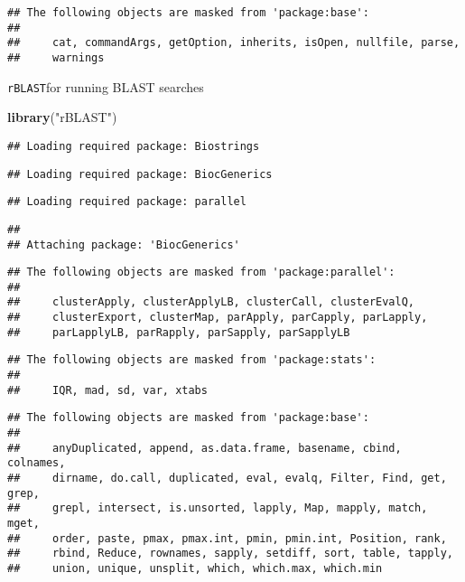 \documentclass[]{article}
\newenvironment{Shaded}{\begin{snugshade}}{\end{snugshade}}
\newcommand{\KeywordTok}[1]{\textcolor[rgb]{0.13,0.29,0.53}{\textbf{#1}}}
\newcommand{\NormalTok}[1]{#1}
\newcommand{\StringTok}[1]{\textcolor[rgb]{0.31,0.60,0.02}{#1}}
\begin{document}
\begin{verbatim}
## The following objects are masked from 'package:base':
## 
##     cat, commandArgs, getOption, inherits, isOpen, nullfile, parse,
##     warnings
\end{verbatim}

\texttt{rBLAST}for running BLAST searches

\begin{Shaded}
\begin{Highlighting}[]
\KeywordTok{library}\NormalTok{(}\StringTok{"rBLAST"}\NormalTok{)}
\end{Highlighting}
\end{Shaded}

\begin{verbatim}
## Loading required package: Biostrings
\end{verbatim}

\begin{verbatim}
## Loading required package: BiocGenerics
\end{verbatim}

\begin{verbatim}
## Loading required package: parallel
\end{verbatim}

\begin{verbatim}
## 
## Attaching package: 'BiocGenerics'
\end{verbatim}

\begin{verbatim}
## The following objects are masked from 'package:parallel':
## 
##     clusterApply, clusterApplyLB, clusterCall, clusterEvalQ,
##     clusterExport, clusterMap, parApply, parCapply, parLapply,
##     parLapplyLB, parRapply, parSapply, parSapplyLB
\end{verbatim}

\begin{verbatim}
## The following objects are masked from 'package:stats':
## 
##     IQR, mad, sd, var, xtabs
\end{verbatim}

\begin{verbatim}
## The following objects are masked from 'package:base':
## 
##     anyDuplicated, append, as.data.frame, basename, cbind, colnames,
##     dirname, do.call, duplicated, eval, evalq, Filter, Find, get, grep,
##     grepl, intersect, is.unsorted, lapply, Map, mapply, match, mget,
##     order, paste, pmax, pmax.int, pmin, pmin.int, Position, rank,
##     rbind, Reduce, rownames, sapply, setdiff, sort, table, tapply,
##     union, unique, unsplit, which, which.max, which.min
\end{verbatim}
\end{document}
